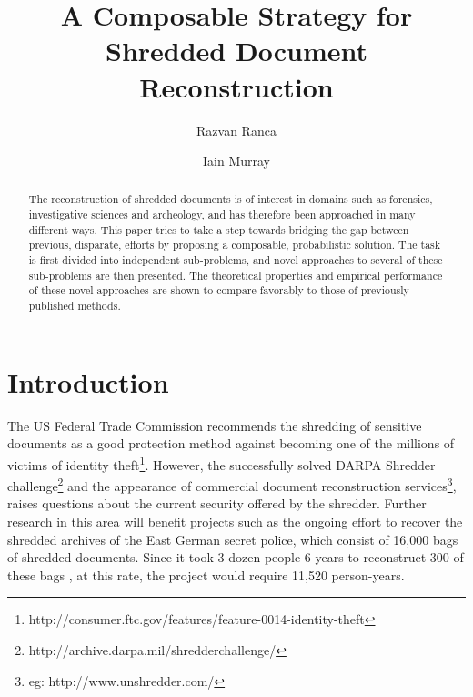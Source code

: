 \documentclass{llncs}
\begin{document}
\title{A Composable Strategy for Shredded Document Reconstruction}

\author{Razvan Ranca \and Iain Murray}


\maketitle              %

\begin{abstract}
The reconstruction of shredded documents is of interest in domains such as forensics, investigative sciences and  archeology, and has therefore been approached in many different ways. This paper tries to take a step towards bridging the gap between previous, disparate, efforts by proposing a composable, probabilistic solution. The task is first divided into independent sub-problems, and novel approaches to several of these sub-problems are then presented. The theoretical properties and empirical performance of these novel approaches are shown to compare favorably to those of previously published methods.
\end{abstract}

\section{Introduction}

The US Federal Trade Commission recommends the shredding of sensitive documents as a good protection method against becoming one of the millions of victims of identity theft\footnote{http://consumer.ftc.gov/features/feature-0014-identity-theft}. However, the successfully solved DARPA Shredder challenge\footnote{http://archive.darpa.mil/shredderchallenge/} and the appearance of commercial document reconstruction services\footnote{eg: http://www.unshredder.com/}, raises questions about the current security offered by the shredder. Further research in this area will benefit projects such as the ongoing effort to recover the shredded archives of the East German secret police, which consist of 16,000 bags of shredded documents. Since it took 3 dozen people 6 years to reconstruct 300 of these bags \cite{P6}, at this rate, the project would require 11,520 person-years.
\end{document}
